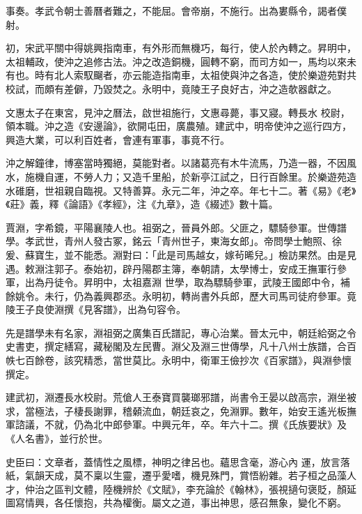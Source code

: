 \begin{pinyinscope}
 事奏。孝武令朝士善曆者難之，不能屈。會帝崩，不施行。出為婁縣令，謁者僕射。



 初，宋武平關中得姚興指南車，有外形而無機巧，每行，使人於內轉之。昇明中，太祖輔政，使沖之追修古法。沖之改造銅機，圓轉不窮，而司方如一，馬均以來未有也。時有北人索馭飀者，亦云能造指南車，太祖使與沖之各造，使於樂遊苑對共校試，而頗有差僻，乃毀焚之。永明中，竟陵王子良好古，沖之造欹器獻之。



 文惠太子在東宮，見沖之曆法，啟世祖施行，文惠尋薨，事又寢。轉長水
 校尉，領本職。沖之造《安邊論》，欲開屯田，廣農殖。建武中，明帝使沖之巡行四方，興造大業，可以利百姓者，會連有軍事，事竟不行。



 沖之解鐘律，博塞當時獨絕，莫能對者。以諸葛亮有木牛流馬，乃造一器，不因風水，施機自運，不勞人力；又造千里船，於新亭江試之，日行百餘里。於樂遊苑造水碓磨，世祖親自臨視。又特善算。永元二年，沖之卒。年七十二。著《易》《老》《莊》義，釋《論語》《孝經》，注《九章》，造《綴述》數十篇。



 賈淵，字希鏡，平陽襄陵人也。祖弼之，晉員外郎。父匪之，驃騎參軍。世傳譜學。孝武世，青州人發古冢，銘云「青州世子，東海女郎」。帝問學士鮑照、徐爰、蘇寶生，並不能悉。淵對曰：「此是司馬越女，嫁茍晞兒。」檢訪果然。由是見遇。敕淵注郭子。泰始初，辟丹陽郡主簿，奉朝請，太學博士，安成王撫軍行參軍，出為丹徒令。昇明中，太祖嘉淵
 世學，取為驃騎參軍，武陵王國郎中令，補餘姚令。未行，仍為義興郡丞。永明初，轉尚書外兵郎，歷大司馬司徒府參軍。竟陵王子良使淵撰《見客譜》，出為句容令。



 先是譜學未有名家，淵祖弼之廣集百氏譜記，專心治業。晉太元中，朝廷給弼之令史書吏，撰定繕寫，藏秘閣及左民曹。淵父及淵三世傳學，凡十八州士族譜，合百帙七百餘卷，該究精悉，當世莫比。永明中，衛軍王儉抄次《百家譜》，與淵參懷撰定。



 建武初，淵遷長水校尉。荒傖人王泰寶買襲瑯邪譜，尚書令王晏以啟高宗，淵坐被求，當極法，子棲長謝罪，稽顙流血，朝廷哀之，免淵罪。數年，始安王遙光板撫軍諮議，不就，仍為北中郎參軍。中興元年，卒。年六十二。撰《氏族要狀》及《人名書》，並行於世。



 史臣曰：文章者，蓋情性之風標，神明之律呂也。蘊思含毫，游心內
 運，放言落紙，氣韻天成，莫不稟以生靈，遷乎愛嗜，機見殊門，賞悟紛雜。若子桓之品藻人才，仲治之區判文體，陸機辨於《文賦》，李充論於《翰林》，張視擿句褒貶，顏延圖寫情興，各任懷抱，共為權衡。屬文之道，事出神思，感召無象，變化不窮。




\end{pinyinscope}
